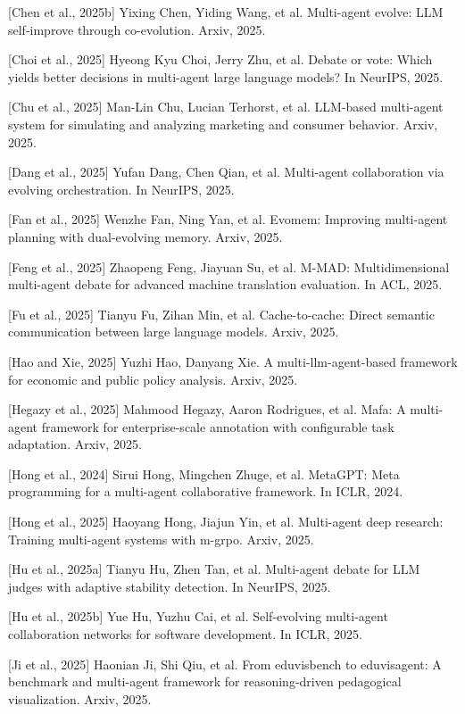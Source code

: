 \documentclass[UTF8,a4paper,12pt]{article}
\begin{document}
{[}Chen et al., 2025b{]} Yixing Chen, Yiding Wang, et al. Multi-agent evolve: LLM self-improve through co-evolution. Arxiv, 2025.

{[}Choi et al., 2025{]} Hyeong Kyu Choi, Jerry Zhu, et al. Debate or vote: Which yields better decisions in multi-agent large language models? In NeurIPS, 2025.

{[}Chu et al., 2025{]} Man-Lin Chu, Lucian Terhorst, et al. LLM-based multi-agent system for simulating and analyzing marketing and consumer behavior. Arxiv, 2025.

{[}Dang et al., 2025{]} Yufan Dang, Chen Qian, et al. Multi-agent collaboration via evolving orchestration. In NeurIPS, 2025.

{[}Fan et al., 2025{]} Wenzhe Fan, Ning Yan, et al. Evomem: Improving multi-agent planning with dual-evolving memory. Arxiv, 2025.

{[}Feng et al., 2025{]} Zhaopeng Feng, Jiayuan Su, et al. M-MAD: Multidimensional multi-agent debate for advanced machine translation evaluation. In ACL, 2025.

{[}Fu et al., 2025{]} Tianyu Fu, Zihan Min, et al. Cache-to-cache: Direct semantic communication between large language models. Arxiv, 2025.

{[}Hao and Xie, 2025{]} Yuzhi Hao, Danyang Xie. A multi-llm-agent-based framework for economic and public policy analysis. Arxiv, 2025.

{[}Hegazy et al., 2025{]} Mahmood Hegazy, Aaron Rodrigues, et al. Mafa: A multi-agent framework for enterprise-scale annotation with configurable task adaptation. Arxiv, 2025.

{[}Hong et al., 2024{]} Sirui Hong, Mingchen Zhuge, et al. MetaGPT: Meta programming for a multi-agent collaborative framework. In ICLR, 2024.

{[}Hong et al., 2025{]} Haoyang Hong, Jiajun Yin, et al. Multi-agent deep research: Training multi-agent systems with m-grpo. Arxiv, 2025.

{[}Hu et al., 2025a{]} Tianyu Hu, Zhen Tan, et al. Multi-agent debate for LLM judges with adaptive stability detection. In NeurIPS, 2025.

{[}Hu et al., 2025b{]} Yue Hu, Yuzhu Cai, et al. Self-evolving multi-agent collaboration networks for software development. In ICLR, 2025.

{[}Ji et al., 2025{]} Haonian Ji, Shi Qiu, et al. From eduvisbench to eduvisagent: A benchmark and multi-agent framework for reasoning-driven pedagogical visualization. Arxiv, 2025.
\end{document}
